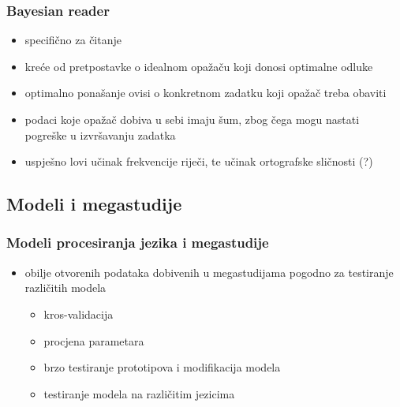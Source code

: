 \documentclass[aspectratio=169]{beamer}
\begin{document}
\begin{frame}
    \frametitle{Bayesian reader \citep{norrisBayesianReaderExplaining2006}}

    \begin{itemize}
        \item specifično za čitanje

        \pause

        \item kreće od pretpostavke o idealnom opažaču koji donosi optimalne
            odluke

        \pause

        \item optimalno ponašanje ovisi o konkretnom zadatku koji opažač treba
            obaviti

        \item podaci koje opažač dobiva u sebi imaju šum, zbog čega mogu nastati
            pogreške u izvršavanju zadatka

        \pause

        \item uspješno lovi učinak frekvencije riječi, te učinak ortografske
            sličnosti (?)
    \end{itemize}
\end{frame}

\subsection{Modeli i megastudije}

\begin{frame}
    \frametitle{Modeli procesiranja jezika i megastudije}

    \begin{itemize}
        \item obilje otvorenih podataka dobivenih u megastudijama pogodno za
            testiranje različitih modela

            \begin{itemize}
                \item kros-validacija

                \item procjena parametara

                \item brzo testiranje prototipova i modifikacija modela

                \item testiranje modela na različitim jezicima
            \end{itemize}

    \end{itemize}
\end{frame}
\end{document}
